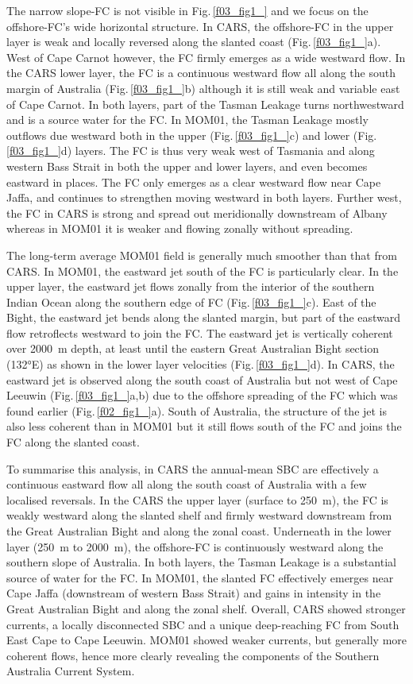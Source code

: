 \documentclass[preprint,3p,review,12pt]{elsarticle}
\begin{document}
The narrow slope-FC is not visible in Fig.\,\ref{f03_fig1_} and we focus on the offshore-FC's wide horizontal structure.
In CARS, the offshore-FC in the upper layer is weak and locally reversed along the slanted coast (Fig.\,\ref{f03_fig1_}a). West of Cape Carnot however, the FC firmly emerges as a wide westward flow.
In the CARS lower layer, the FC is a continuous westward flow all along the south margin of Australia (Fig.\,\ref{f03_fig1_}b) although it is still weak and variable east of Cape Carnot.
In both layers, part of the Tasman Leakage turns northwestward and is a source water for the FC\@.
In MOM01, the Tasman Leakage mostly outflows due westward both in the upper (Fig.\,\ref{f03_fig1_}c) and lower (Fig.\,\ref{f03_fig1_}d) layers. The FC is thus very weak west of Tasmania and along western Bass Strait in both the upper and lower layers, and even becomes eastward in places. The FC only emerges as a clear westward flow near Cape Jaffa, and continues to strengthen moving westward in both layers. 
Further west, the FC in CARS
is strong and spread out meridionally downstream of Albany whereas in MOM01 it is weaker and flowing zonally without spreading.

The long-term average MOM01 field is generally much smoother than that from CARS\@. In MOM01, the eastward jet south of the FC is particularly clear.
In the upper layer, the eastward jet flows zonally from the interior of the southern Indian Ocean along the southern edge of FC (Fig.\,\ref{f03_fig1_}c). East of the Bight, the eastward jet bends along the slanted margin, but part of the eastward flow retroflects westward to join the FC\@.
The eastward jet is vertically coherent over \SI{2000}{\meter} depth, at least until the eastern Great Australian Bight section (\ang{132}E) as shown in the lower layer velocities (Fig.\,\ref{f03_fig1_}d). In CARS, the eastward jet is observed along the south coast of Australia but not west of Cape Leeuwin (Fig.\,\ref{f03_fig1_}a,b) due to the offshore spreading of the FC
which was found earlier (Fig.\,\ref{f02_fig1_}a). South of Australia, the structure of the jet is also
less coherent
than in MOM01
but it still flows south of the FC and
joins the FC along the slanted coast.

To summarise this analysis, in CARS the annual-mean SBC are effectively a continuous eastward flow all along the south coast of Australia with a few localised reversals.
In the CARS the upper layer (surface to \SI{250}{\meter}), the FC is weakly westward along the slanted shelf and firmly westward downstream from the Great Australian Bight and along the zonal coast. Underneath in the lower layer (\SI{250}{\meter} to \SI{2000}{\meter}), the offshore-FC is continuously westward along the southern slope of Australia. In both layers, the Tasman Leakage is
a substantial source of water for the FC\@.
In MOM01, the slanted FC effectively emerges near Cape Jaffa (downstream of western Bass Strait) and gains in intensity in the Great Australian Bight and along the zonal shelf. Overall, CARS showed stronger currents, a locally disconnected SBC and a unique deep-reaching FC from South East Cape to Cape Leeuwin. MOM01 showed weaker currents, but generally more coherent flows,
hence more clearly revealing the
components of the Southern Australia Current System. 
\end{document}
